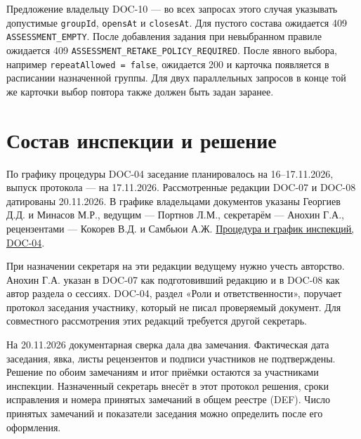 \documentclass[12pt,a4paper]{article}
\begin{document}
Предложение владельцу DOC-10 --- во всех запросах этого случая указывать допустимые \texttt{groupId}, \texttt{opensAt} и \texttt{closesAt}. Для пустого состава ожидается 409 \texttt{ASSESSMENT\_\allowbreak{}EMPTY}. После добавления задания при невыбранном правиле ожидается 409 \texttt{ASSESSMENT\_\allowbreak{}RETAKE\_\allowbreak{}POLICY\_\allowbreak{}REQUIRED}. После явного выбора, например \texttt{repeat\allowbreak{}Allowed =\allowbreak{} false}, ожидается 200 и карточка появляется в расписании назначенной группы. Для двух параллельных запросов в конце той же карточки выбор повтора также должен быть задан заранее.

\section{Состав инспекции и решение}\label{ux441ux43eux441ux442ux430ux432-ux438ux43dux441ux43fux435ux43aux446ux438ux438-ux438-ux440ux435ux448ux435ux43dux438ux435}

\hypertarget{состав-инспекции-и-решение}{}

По графику процедуры DOC-04 заседание планировалось на 16--17.11.2026, выпуск протокола --- на 17.11.2026. Рассмотренные редакции DOC-07 и DOC-08 датированы 20.11.2026. В графике владельцами документов указаны Георгиев Д.Д. и Минасов М.Р., ведущим --- Портнов Л.М., секретарём --- Анохин Г.А., рецензентами --- Кокорев В.Д. и Самбьюи А.Ж. {\href{../../06\_Процедура\_формальной\_инспекции/Процедура\_формальной\_инспекции.pdf}{Процедура и график инспекций, DOC-04}}.

При назначении секретаря на эти редакции ведущему нужно учесть авторство. Анохин Г.А. указан в DOC-07 как подготовивший редакцию и в DOC-08 как автор раздела о сессиях. DOC-04, раздел «Роли и ответственности», поручает протокол заседания участнику, который не писал проверяемый документ. Для совместного рассмотрения этих редакций требуется другой секретарь.

На 20.11.2026 документарная сверка дала два замечания. Фактическая дата заседания, явка, листы рецензентов и подписи участников не подтверждены. Решение по обоим замечаниям и итог приёмки остаются за участниками инспекции. Назначенный секретарь внесёт в этот протокол решения, сроки исправления и номера принятых замечаний в общем реестре (DEF). Число принятых замечаний и показатели заседания можно определить после его оформления.
\end{document}

